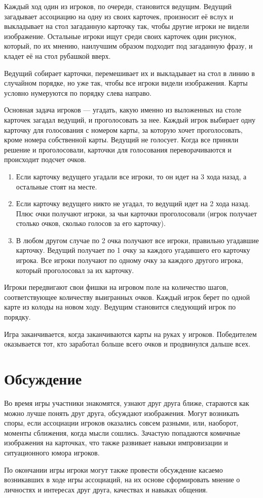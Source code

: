 Каждый ход один из игроков, по очереди, становится ведущим. Ведущий загадывает ассоциацию на одну из своих карточек, произносит её вслух и выкладывает на стол загаданную карточку так, чтобы другие игроки не видели изображение. Остальные игроки ищут среди своих карточек один рисунок, который, по их мнению, наилучшим образом подходит под загаданную фразу, и кладет её на стол рубашкой вверх.

Ведущий собирает карточки, перемешивает их и выкладывает на стол в линию в случайном порядке, но уже так, чтобы все игроки видели изображения. Карты условно нумеруются по порядку слева направо.

Основная задача игроков — угадать, какую именно из выложенных на столе карточек загадал ведущий, и проголосовать за нее. Каждый игрок выбирает одну карточку для голосования с номером карты, за которую хочет проголосовать, кроме номера собственной карты. Ведущий не голосует. Когда все приняли решение и проголосовали, карточки для голосования переворачиваются и происходит подсчет очков.

\begin{enumerate}
	\item Если карточку ведущего угадали все игроки, то он идет на 3 хода назад, а остальные стоят на месте.
	\item Если карточку ведущего никто не угадал, то ведущий идет на 2 хода назад. Плюс очки получают игроки, за чьи карточки проголосовали (игрок получает столько очков, сколько голосов за его карточку).
	\item В любом другом случае по 2 очка получают все игроки, правильно угадавшие карточку. Ведущий получает по 1 очку за каждого угадавшего его карточку игрока. Все игроки получают по одному очку за каждого другого игрока, который проголосовал за их карточку.
\end{enumerate}

Игроки передвигают свои фишки на игровом поле на количество шагов, соответствующее количеству выигранных очков. Каждый игрок берет по одной карте из колоды на новом ходу. Ведущим становится следующий игрок по порядку.

Игра заканчивается, когда заканчиваются карты на руках у игроков. Победителем оказывается тот, кто заработал больше всего очков и продвинулся дальше всех.

\chapter{Обсуждение}
Во время игры участники знакомятся, узнают друг друга ближе, стараются как можно лучше понять друг друга, обсуждают изображения. Могут возникать споры, если ассоциации игроков оказались совсем разными, или, наоборот, моменты сближения, когда мысли сошлись. Зачастую попадаются комичные изображения на карточках, что также развивает навыки импровизации и ситуационного юмора игроков.

По окончании игры игроки могут также провести обсуждение касаемо возникавших в ходе игры ассоциаций, на их основе сформировать мнение о личностях и интересах друг друга, качествах и навыках общения.

\newpage